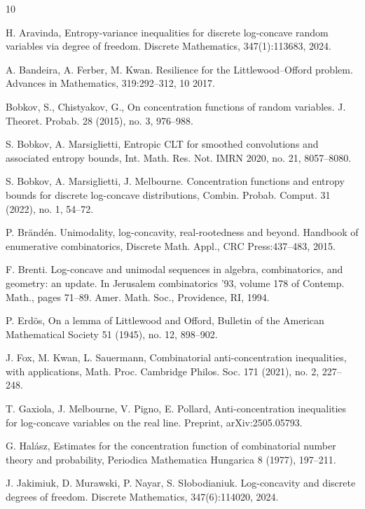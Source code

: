 \documentclass[11pt]{article}
\newcommand{\1}{[1]}
\begin{document}
\begin{thebibliography}{10}


 H. Aravinda, Entropy-variance inequalities for discrete log-concave random variables via degree of
freedom. Discrete Mathematics, 347(1):113683, 2024.

 A. Bandeira, A. Ferber, M. Kwan. Resilience for the {L}ittlewood–{O}fford problem. Advances in Mathematics, 319:292–312, 10 2017.

 Bobkov, S., Chistyakov, G., On concentration functions of random variables. J. Theoret. Probab. 28 (2015), no. 3, 976--988.

 S. Bobkov, A. Marsiglietti, Entropic CLT for smoothed convolutions and associated entropy bounds, Int. Math. Res. Not. IMRN 2020, no. 21, 8057--8080.

 S. Bobkov, A. Marsiglietti, J. Melbourne. Concentration functions and entropy bounds for discrete log-concave distributions, Combin. Probab. Comput. 31 (2022), no. 1, 54--72.

  P. Br\"and\'en. Unimodality, log-concavity, real-rootedness and beyond. Handbook of enumerative combinatorics, Discrete Math. Appl., CRC Press:437--483, 2015.

 F. Brenti. Log-concave and unimodal sequences in algebra, combinatorics, and geometry: an update. In Jerusalem combinatorics ’93, volume 178 of Contemp. Math., pages 71--89.
Amer. Math. Soc., Providence, RI, 1994.

 P. Erd\"os, On a lemma of Littlewood and Oﬀord, Bulletin of the American Mathematical Society 51 (1945), no. 12, 898–902.

 J. Fox, M. Kwan, L. Sauermann, Combinatorial anti-concentration inequalities, with applications, Math. Proc. Cambridge Philos. Soc. 171 (2021), no. 2, 227--248.

 T. Gaxiola, J. Melbourne, V. Pigno, E. Pollard, Anti-concentration inequalities for log-concave variables on the real line. Preprint, arXiv:2505.05793.

 G. Hal\'asz, Estimates for the concentration function of combinatorial number theory and probability, Periodica Mathematica Hungarica 8 (1977), 197--211.

 J. Jakimiuk, D. Murawski, P. Nayar, S. S\l obodianiuk. Log-concavity and discrete degrees of freedom. Discrete Mathematics, 347(6):114020, 2024.


\end{thebibliography}
\end{document}
